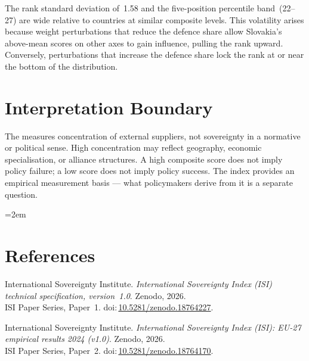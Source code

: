 \documentclass[12pt,a4paper]{article}
\begin{document}
The rank standard deviation of~1.58 and the five-position percentile band~(22--27) are wide relative to countries at similar composite levels.  This volatility arises because weight perturbations that reduce the defence share allow Slovakia's above-mean scores on other axes to gain influence, pulling the rank upward.  Conversely, perturbations that increase the defence share lock the rank at or near the bottom of the distribution.


\section{Interpretation Boundary}
\label{sec:interpretation}

The \ISI measures concentration of external suppliers, not sovereignty in a normative or political sense.  High concentration may reflect geography, economic specialisation, or alliance structures.  A high composite score does not imply policy failure; a low score does not imply policy success.  The index provides an empirical measurement basis --- what policymakers derive from it is a separate question.


\clearpage
\vspace*{1.5cm}

\begingroup\emergencystretch=2em
\section*{References}

\begin{enumerate}[label={[\arabic*]},leftmargin=2em,itemsep=6pt]
\item International Sovereignty Institute.
  \textit{International Sovereignty Index (ISI) technical specification, version~1.0}.
  Zenodo, 2026.\\ISI Paper Series, Paper~1.
  doi:\,\href{https://doi.org/10.5281/zenodo.18764227}{10.5281/zenodo.18764227}.

\item International Sovereignty Institute.
  \textit{International Sovereignty Index (ISI): EU-27 empirical results 2024 (v1.0)}.
  Zenodo, 2026.\\ISI Paper Series, Paper~2.
  doi:\,\href{https://doi.org/10.5281/zenodo.18764170}{10.5281/zenodo.18764170}.
\end{enumerate}
\endgroup
\end{document}
